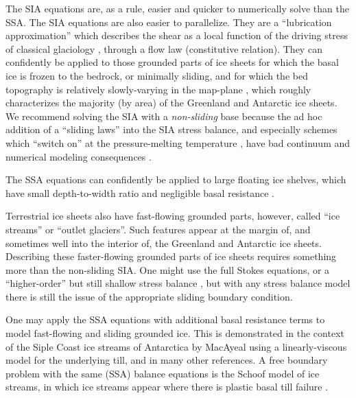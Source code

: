 \documentclass[11pt,final]{amsart}
\begin{document}
The SIA equations are, as a rule, easier and quicker to numerically solve than the SSA.  The SIA equations are also easier to parallelize.  They are a ``lubrication approximation'' \cite{Fowler} which describes the shear as a local function of the driving stress of classical glaciology \cite{Paterson}, through a flow law (constitutive relation).  They can confidently be applied to those grounded parts of ice sheets for which the basal ice is frozen to the bedrock, or minimally sliding, and for which the bed topography is relatively slowly-varying in the map-plane \cite{Fowler}, which roughly characterizes the majority (by area) of the Greenland and Antarctic ice sheets.  We recommend solving the SIA with a \emph{non-sliding} base because the ad hoc addition of a ``sliding laws'' into the SIA stress balance, and especially schemes which ``switch on'' at the pressure-melting temperature \cite{EISMINT00}, have bad continuum and numerical modeling consequences \cite[appendix B]{BBssasliding}.

The SSA equations can confidently be applied to large floating ice shelves, which have small depth-to-width ratio and negligible basal resistance \cite{Morland,MorlandZainuddin}.

Terrestrial ice sheets also have fast-flowing grounded parts, however, called ``ice streams'' or ``outlet glaciers''.  Such features appear at the margin of, and sometimes well into the interior of, the Greenland \cite{Joughinetal2001} and Antarctic \cite{BamberVaughanJoughin} ice sheets.  Describing these faster-flowing grounded parts of ice sheets requires something more than the non-sliding SIA.  One might use the full Stokes equations, or a ``higher-order'' but still shallow stress balance \cite{Blatter,Pattyn03}, but with any stress balance model there is still the issue of the appropriate sliding boundary condition.

One may apply the SSA equations with additional basal resistance terms to model fast-flowing and sliding grounded ice.  This is demonstrated in the context of the Siple Coast ice streams of Antarctica by MacAyeal \cite{HulbeMacAyeal,MacAyeal} using a linearly-viscous model for the underlying till, and in many other references.  A free boundary problem with the same (SSA) balance equations is the Schoof \cite{SchoofStream} model of ice streams, in which ice streams appear where there is plastic basal till failure \cite{Paterson}.
\end{document}

